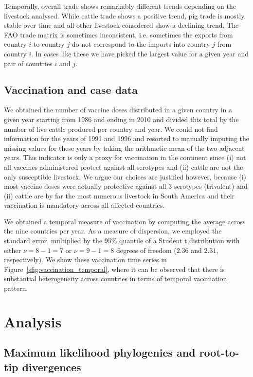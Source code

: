 \documentclass[a4paper,10pt]{article}
\begin{document}
Temporally, overall trade shows remarkably different trends depending on the livestock analysed.
While cattle trade shows a positive trend, pig trade is mostly stable over time and all other livestock considered show a declining trend.
The FAO trade matrix is sometimes inconsistent, i.e. sometimes the exports from country $i$ to country $j$ do not correspond to the imports into country $j$ from country $i$.
In cases like these we have picked the largest value for a given year and pair of countries $i$ and $j$.

\subsection*{Vaccination and case data}

We obtained the number of vaccine doses distributed in a given country in a given year starting from 1986 and ending in 2010 and divided this total by the number of live cattle produced per country and year.
We could not find information for the years of 1991 and 1996 and resorted to manually imputing the missing values for these years by taking the arithmetic mean of the two adjacent years.
This indicator is only a proxy for vaccination in the continent since (i) not all vaccines administered protect against all serotypes and (ii) cattle are not the only susceptible livestock.
We argue our choices are justified however, because (i) most vaccine doses were actually protective against all 3 serotypes (trivalent) and (ii) cattle are by far the most numerous livestock in South America and their vaccination is mandatory across all affected countries.

We obtained a temporal measure of vaccination by computing the average across the nine countries per year.
As a measure of dispersion, we employed the standard error, multiplied by the 95\% quantile of a Student t distribution with either $\nu = 8 -1 = 7$ or $\nu = 9-1 = 8$ degrees of freedom ($2.36$ and $2.31$, respectively).
We show these vaccination time series in Figure~\ref{sfig:vaccination_temporal}, where it can be observed that there is substantial heterogeneity across countries in terms of temporal vaccination pattern.

\section*{Analysis}

\subsection*{Maximum likelihood phylogenies and root-to-tip divergences}
\end{document}
